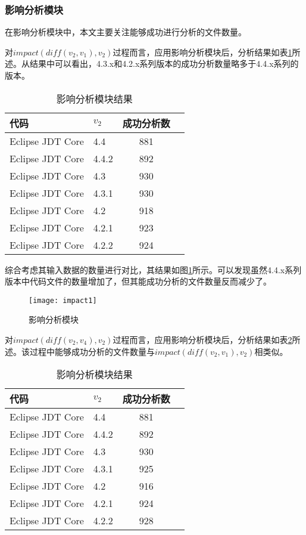 \subsubsection{影响分析模块}

在影响分析模块中，本文主要关注能够成功进行分析的文件数量。

对$impact(diff(v_2,v_1),v_2)$过程而言，应用影响分析模块后，分析结果如表\ref {data_impact_1}所述。从结果中可以看出，4.3.x和4.2.x系列版本的成功分析数量略多于4.4.x系列的版本。

\begin{table}[H]
	\caption{影响分析模块结果}
	\label{data_impact_1}
	\centering
	\begin{tabular}{llcc}
		\toprule[1.5pt]
		{\heiti 代码} & {\heiti $v_2$} & {\heiti 成功分析数}  \\\midrule[1pt]
		Eclipse JDT Core & 4.4	 & 881	\\
		Eclipse JDT Core & 4.4.2 & 892 	\\
		Eclipse JDT Core & 4.3	 & 930		\\
		Eclipse JDT Core & 4.3.1 & 930 	\\
		Eclipse JDT Core & 4.2 	 &	918		\\
		Eclipse JDT Core & 4.2.1 & 923	\\
		Eclipse JDT Core & 4.2.2  & 924		\\
		\bottomrule[1.5pt]
	\end{tabular}
\end{table}

综合考虑其输入数据的数量进行对比，其结果如图\ref {impact1}所示。可以发现虽然4.4.x系列版本中代码文件的数量增加了，但其能成功分析的文件数量反而减少了。

\begin{figure}[H]
	\centering
	\texttt{[image: impact1]}
	\caption {影响分析模块}
	\label {impact1}	
\end{figure}

对$impact(diff(v_2,v_4),v_2)$过程而言，应用影响分析模块后，分析结果如表\ref {data_impact_2}所述。该过程中能够成功分析的文件数量与$impact(diff(v_2,v_1),v_2)$相类似。

\begin{table}[H]
	\caption{影响分析模块结果}
	\label{data_impact_2}
	\centering
	\begin{tabular}{llcc}
		\toprule[1.5pt]
		{\heiti 代码} & {\heiti $v_2$} & {\heiti 成功分析数}  \\\midrule[1pt]
		Eclipse JDT Core & 4.4	 & 881	\\
		Eclipse JDT Core & 4.4.2 & 892	 	\\
		Eclipse JDT Core & 4.3	 & 930			\\
		Eclipse JDT Core & 4.3.1 & 925	 	\\
		Eclipse JDT Core & 4.2 	 & 916			\\
		Eclipse JDT Core & 4.2.1 	 & 924		\\
		Eclipse JDT Core & 4.2.2 	 & 928		\\
		\bottomrule[1.5pt]
	\end{tabular}
\end{table}


